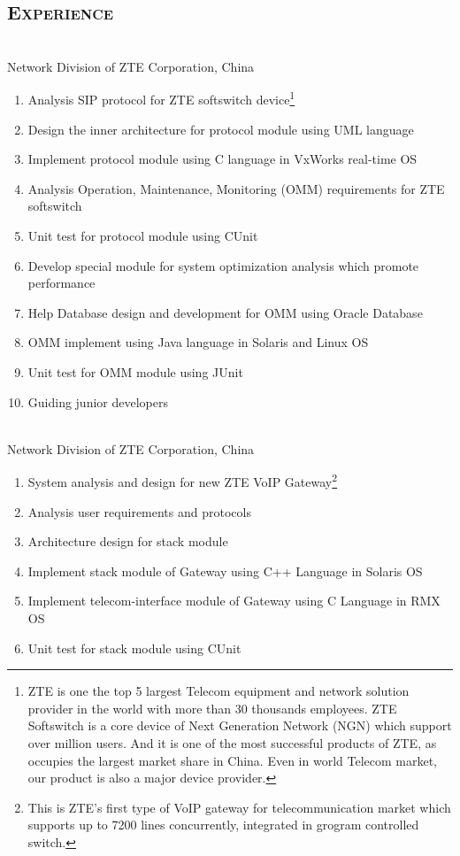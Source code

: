 \documentclass[margin,11pt]{res}
\begin{document}
\begin{resume}
\section{\textsc{Experience}} 
 \\
Network Division of ZTE Corporation, China

    \begin{enumerate}\itemsep -2pt %
    \item Analysis SIP protocol for ZTE softswitch device\footnote{ZTE is
        one the top 5 largest Telecom equipment and network solution provider in the world
        with more than 30 thousands employees. ZTE Softswitch is a core device of Next
        Generation Network (NGN) which support over million users. And it is one of the
        most successful products of ZTE, as occupies the largest market share in China.
        Even in world Telecom market, our product is also a major device provider.}
    \item Design the inner architecture for protocol module using UML language
    \item Implement protocol module using C language in VxWorks real-time OS
    \item Analysis Operation, Maintenance, Monitoring (OMM) requirements for ZTE softswitch
    \item Unit test for protocol module using CUnit
    \item Develop special module for system optimization analysis which promote performance
    \item Help Database design and development for OMM using Oracle Database
    \item OMM implement using Java language in Solaris and Linux OS
    \item Unit test for OMM module using JUnit
    \item Guiding junior developers
    \end{enumerate}
 
     \\
    Network Division of ZTE Corporation, China
     \begin{enumerate}\itemsep -2pt %
     \item System analysis and design for new ZTE VoIP Gateway\footnote{This is ZTE's first type of
         VoIP gateway for telecommunication market which supports up to 7200 lines concurrently,
         integrated in grogram controlled switch. }
     \item Analysis user requirements and protocols
     \item Architecture design for stack module
     \item Implement stack module of Gateway using C++ Language in Solaris OS
     \item Implement telecom-interface module of Gateway using C Language in RMX OS
     \item Unit test for stack module using CUnit
     \end{enumerate} 


\end{resume}
\end{document}
